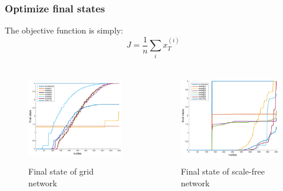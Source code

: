 \documentclass{beamer}
\begin{document}
\begin{frame}
	\frametitle{Optimize final states}
	The objective function is simply:
	\begin{equation}
	\label{eq:obj2}
		J = \frac{1}{n} \sum_i x_T^{(i)}
	\end{equation}

	\begin{columns}
		\begin{column}{0.5\textwidth}
			\begin{figure}
				\centering
				\includegraphics[height=40mm]{./figs/Grid_finalState_small.pdf}
				\vspace{-4mm}
				\caption{Final state of grid network}
			\end{figure}
		\end{column}

		\begin{column}{0.5\textwidth}
			\begin{figure}
				\centering
				\includegraphics[height=40mm]{./figs/SF_finalState_small.pdf}
				\vspace{-4mm}
				\caption{Final state of scale-free network}
			\end{figure}
		\end{column}
	\end{columns}
	
\end{frame}
\end{document}
